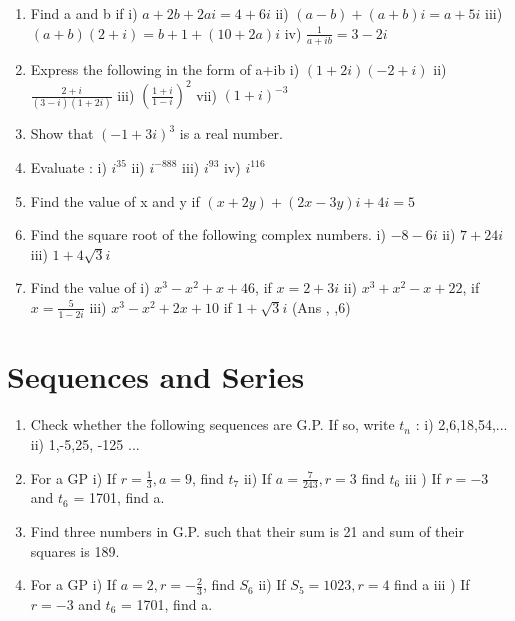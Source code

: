 \documentclass[14pt]{article}
\begin{document}
\begin{multicols}{2}
\begin{enumerate}[resume]
\item Find a and b if i) $a + 2b + 2ai = 4 + 6i$ 
ii) $(a-b) + (a+b)i = a + 5i$
iii) $(a+b) (2 + i) = b + 1 + (10 + 2a)i$
iv) $\frac{1}{a+ib}=3-2i$

\item Express the following in the form of a+ib
i) $(1+2i)(-2+i)$ ii) $\frac{2+i}{(3-i)(1+2i)} $
iii) $\left( \frac{1+i}{1-i} \right)^2$ vii) $(1+i)^{-3}$

\item Show that $(-1+3i)^3$ is a real number.

\item Evaluate : i) $i^{35}$ ii) $i^{-888}$ iii) $i^{93}$ iv) $i^{116}$

\item Find the value of x and y if  $(x+2y) + (2x-3y) i + 4i = 5$

\item Find the square root of the following
complex numbers. i) $-8-6i$ ii) $7+24i$
iii) $1+4\sqrt{3}i$

\item Find the value of i) $x^3 - x^2 +x+46$, if $x = 2+3i$
 ii) $x^3 + x^2 -x+22$, if $x=\frac{5}{1-2i}$ iii) $x^ 3 - x^2 + 2x + 10$ if $1+\sqrt{3}i$ (Ans  , ,6)

\end{enumerate} 





\section{Sequences and Series}
\noindent
\begin{enumerate}[resume]


\item Check  whether the following sequences are
G.P. If so, write $t_n$ : i) 2,6,18,54,... ii) 1,-5,25, -125 ... 

\item For a GP i) If $r=\frac{1}{3},a=9$, find $t_7$ ii) If $a=\frac{7}{243},r=3$ find $t_6$ iii ) If $r = - 3$ and $t_6$ = 1701, find a.

\item Find three numbers in G.P. such that their
sum is 21 and sum of their squares is 189.

\item For a GP i) If $a=2,r=-\frac{2}{3}$, find $S_6$ ii) If $S_5=1023,r=4$ find a  iii ) If $r = - 3$ and $t_6$ = 1701, find a.


\end{enumerate}
\end{multicols}
\end{document}
